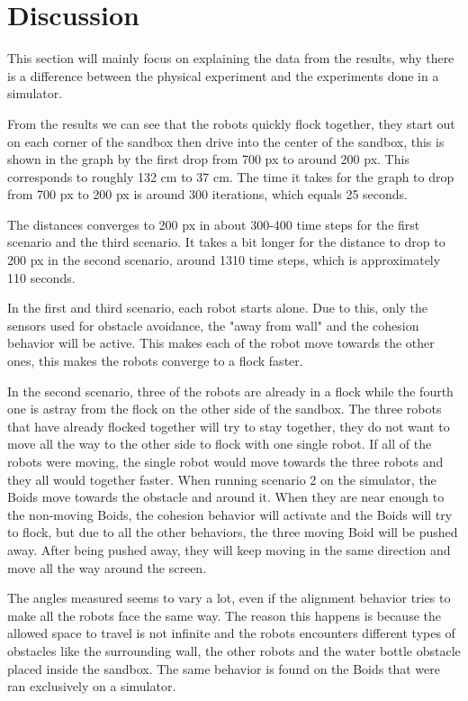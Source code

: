 
\section{Discussion}
\label{sec:discussion}
This section will mainly focus on explaining the data from the results, why there is a difference between the physical experiment and the experiments done in a simulator.

From the results we can see that the robots quickly flock together, they start out on each corner of the sandbox then drive into the center of the sandbox, this is shown in the graph by the first drop from 700 px to around 200 px. This corresponds to roughly 132 cm to 37 cm. The time it takes for the graph to drop from 700 px to 200 px is around 300 iterations, which equals 25 seconds.

The distances converges to 200 px in about 300-400 time steps for the first scenario and the third scenario. It takes a bit longer for the distance to drop to 200 px in the second scenario, around 1310 time steps, which is approximately 110 seconds.

In the first and third scenario, each robot starts alone. Due to this, only the sensors used for obstacle avoidance, the "away from wall" and the cohesion behavior will be active. This makes each of the robot move towards the other ones, this makes the robots converge to a flock faster. 

In the second scenario, three of the robots are already in a flock while the fourth one is astray from the flock on the other side of the sandbox. The three robots that have already flocked together will try to stay together, they do not want to move all the way to the other side to flock with one single robot. If all of the robots were moving, the single robot would move towards the three robots and they all would together faster.
When running scenario 2 on the simulator, the Boids move towards the obstacle and around it. When they are near enough to the non-moving Boids, the cohesion behavior will activate and the Boids will try to flock, but due to all the other behaviors, the three moving Boid will be pushed away. After being pushed away, they will keep moving in the same direction and move all the way around the screen.

The angles measured seems to vary a lot, even if the alignment behavior tries to make all the robots face the same way. The reason this happens is because the allowed space to travel is not infinite and the robots encounters different types of obstacles like the surrounding wall, the other robots and the water bottle obstacle placed inside the sandbox. The same behavior is found on the Boids that were ran exclusively on a simulator. 


